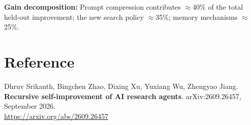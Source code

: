 \documentclass[10pt,twocolumn]{article}
\begin{document}
\textbf{Gain decomposition:} Prompt compression contributes $\approx$40\% of
the total held-out improvement; the new search policy $\approx$35\%; memory
mechanisms $\approx$25\%.

\section*{Reference}

Dhruv Srikanth, Bingchen Zhao, Dixing Xu, Yuxiang Wu, Zhengyao Jiang.
\textbf{Recursive self-improvement of AI research agents}.
arXiv:2609.26457, September 2026.\\
\url{https://arxiv.org/abs/2609.26457}
\end{document}
